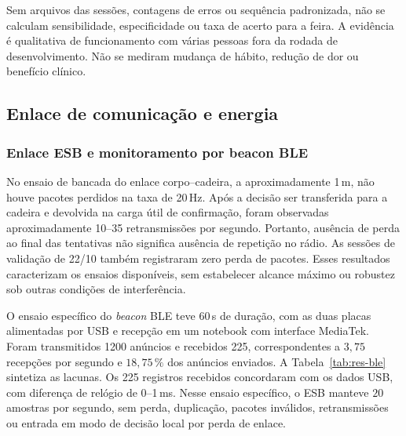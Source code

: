 Sem arquivos das sessões, contagens de erros ou sequência padronizada,
não se calculam sensibilidade, especificidade ou taxa de acerto para a feira.
A evidência é qualitativa de funcionamento com várias pessoas fora da rodada
de desenvolvimento. Não se mediram mudança de hábito, redução de dor ou
benefício clínico.

\subsection{Enlace de comunicação e energia}
\label{sec:res-enlace-energia}

\subsubsection{Enlace ESB e monitoramento por beacon BLE}

No ensaio de bancada do enlace corpo--cadeira, a aproximadamente 1\,m, não
houve pacotes perdidos na taxa de 20\,Hz. Após a decisão ser transferida
para a cadeira e devolvida na carga útil de confirmação, foram observadas
aproximadamente 10--35 retransmissões por segundo. Portanto, ausência de
perda ao final das tentativas não significa ausência de repetição no rádio.
As sessões de validação de 22/10 também registraram zero perda de pacotes.
Esses resultados caracterizam os ensaios disponíveis, sem estabelecer alcance
máximo ou robustez sob outras condições de interferência.

O ensaio específico do \textit{beacon} BLE teve 60\,s de duração, com as
duas placas alimentadas por USB e recepção em um notebook com interface
MediaTek. Foram transmitidos 1200 anúncios e recebidos 225, correspondentes
a $3{,}75$ recepções por segundo e $18{,}75\,\%$ dos anúncios enviados.
A Tabela~\ref{tab:res-ble} sintetiza as lacunas. Os 225 registros recebidos
concordaram com os dados USB, com diferença de relógio de 0--1\,ms.
Nesse ensaio específico, o ESB manteve $20$ amostras por segundo, sem perda,
duplicação, pacotes inválidos, retransmissões ou entrada em modo de decisão
local por perda de enlace.

